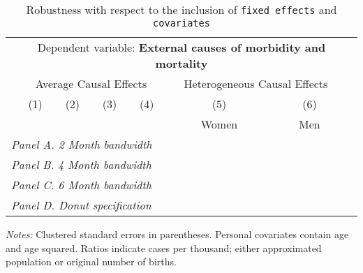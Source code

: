 \begin{table}[H] \begin{threeparttable} \centering \caption{Robustness with respect to the inclusion of \texttt{fixed effects} and \texttt{covariates}} {\def\sym#1{\ifmmode^{#1}\else\(^{#1}\)\fi} \begin{tabular}{l*{7}{c}} \toprule & \multicolumn{6}{c}{Dependent variable: \textbf{External causes of morbidity and mortality}} \\ \cmidrule(lr){2-7}
            &\multicolumn{4}{c}{Average Causal Effects}         &\multicolumn{2}{c}{Heterogeneous Causal Effects}\\\cmidrule(lr){2-5}\cmidrule(lr){6-7}
            &\multicolumn{1}{c}{(1)}&\multicolumn{1}{c}{(2)}&\multicolumn{1}{c}{(3)}&\multicolumn{1}{c}{(4)}&\multicolumn{1}{c}{(5)}&\multicolumn{1}{c}{(6)}\\
            &\multicolumn{1}{c}{}&\multicolumn{1}{c}{}&\multicolumn{1}{c}{}&\multicolumn{1}{c}{}&\multicolumn{1}{c}{Women}&\multicolumn{1}{c}{Men}\\
\midrule
 \multicolumn{7}{l}{\emph{Panel A. 2 Month bandwidth}} \\    \midrule\multicolumn{7}{l}{\emph{Panel B. 4 Month bandwidth}} \\    \midrule\multicolumn{7}{l}{\emph{Panel C. 6 Month bandwidth}} \\    \midrule\multicolumn{7}{l}{\emph{Panel D. Donut specification}} \\    \midrule  
\bottomrule \end{tabular} } \begin{tablenotes} \item \scriptsize \emph{Notes:} Clustered standard errors in parentheses. Personal covariates contain age and age squared. Ratios indicate cases per thousand; either approximated population or original number of births. \end{tablenotes} \end{threeparttable} \end{table} 
